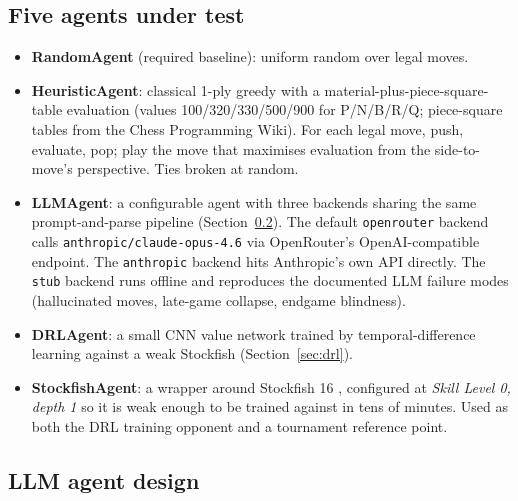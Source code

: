 \documentclass[11pt,a4paper]{article}
\begin{document}
\subsection{Five agents under test}
\label{sec:five-agents}

\begin{itemize}
  \item \textbf{RandomAgent} (required baseline): uniform random over
    legal moves.
  \item \textbf{HeuristicAgent}: classical 1-ply greedy with a
    material-plus-piece-square-table evaluation (values 100/320/330/500/900
    for P/N/B/R/Q; piece-square tables from the Chess Programming
    Wiki). For each legal move, push, evaluate, pop; play the move
    that maximises evaluation from the side-to-move's perspective.
    Ties broken at random.
  \item \textbf{LLMAgent}: a configurable agent with three backends
    sharing the same prompt-and-parse pipeline (Section~\ref{sec:llm}).
    The default \texttt{openrouter} backend calls
    \texttt{anthropic/claude-opus-4.6} via OpenRouter's
    OpenAI-compatible endpoint. The \texttt{anthropic} backend hits
    Anthropic's own API directly. The \texttt{stub} backend runs
    offline and reproduces the documented LLM failure modes
    (hallucinated moves, late-game collapse, endgame blindness).
  \item \textbf{DRLAgent}: a small CNN value network trained by
    temporal-difference learning against a weak Stockfish
    (Section~\ref{sec:drl}).
  \item \textbf{StockfishAgent}: a wrapper around Stockfish 16
    \cite{stockfish}, configured at \emph{Skill Level 0, depth 1} so
    it is weak enough to be trained against in tens of minutes. Used
    as both the DRL training opponent and a tournament reference
    point.
\end{itemize}

\subsection{LLM agent design}
\label{sec:llm}
\end{document}

